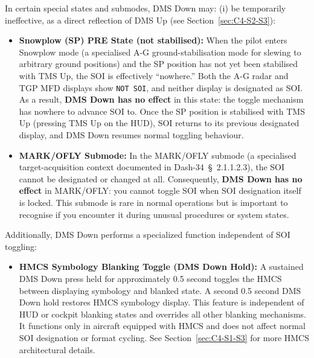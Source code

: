 \documentclass[11pt, a4paper, twoside]{report}
\providecommand{\dashref}[1]{Dash-34~\S~#1}
\begin{document}
In certain special states and submodes, DMS Down may: (i) be temporarily ineffective, as a direct reflection of DMS Up (see Section~\ref{sec:C4-S2-S3}):

\begin{itemize}
	\item \textbf{Snowplow (SP) PRE State (not stabilised):} When the pilot enters Snowplow mode (a specialised A-G ground-stabilisation mode for slewing to arbitrary ground positions) and the SP position has not yet been stabilised with TMS Up, the SOI is effectively ``nowhere.'' Both the A-G radar and TGP MFD displays show \texttt{NOT SOI}, and neither display is designated as SOI. As a result, \textbf{DMS Down has no effect} in this state: the toggle mechanism has nowhere to advance SOI to. Once the SP position is stabilised with TMS Up (pressing TMS Up on the HUD), SOI returns to its previous designated display, and DMS Down resumes normal toggling behaviour.
	
	\item \textbf{MARK/OFLY Submode:} In the MARK/OFLY submode (a specialised target-acquisition context documented in \dashref{2.1.1.2.3}), the SOI cannot be designated or changed at all. Consequently, \textbf{DMS Down has no effect} in MARK/OFLY: you cannot toggle SOI when SOI designation itself is locked. This submode is rare in normal operations but is important to recognise if you encounter it during unusual procedures or system states.
\end{itemize}

Additionally, DMS Down performs a specialized function independent of SOI toggling:

\begin{itemize}
	\item \textbf{HMCS Symbology Blanking Toggle (DMS Down Hold):} 
	A sustained DMS Down press held for approximately 0.5 second toggles the HMCS between displaying symbology and blanked state. A second 0.5 second DMS Down hold restores HMCS symbology display. This feature is independent of HUD or cockpit blanking states and overrides all other blanking mechanisms. It functions only in aircraft equipped with HMCS and does not affect normal SOI designation or format cycling. See Section~\ref{sec:C4-S1-S3} for more HMCS architectural details.
\end{itemize}

\end{document}
